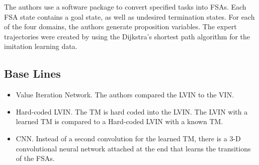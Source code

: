 \documentclass[letterpaper, 10 pt, conference]{ieeeconf}  %
\begin{document}
The authors use a software package to convert specified tasks into FSAs. Each FSA state contains a goal state, as well as undesired termination states. For each of the four domains, the authors generate proposition variables. The expert trajectories were created by using the Dijkstra's shortest path algorithm for the imitation learning data.

\subsection{Base Lines}

\begin{itemize}
  \item Value Iteration Network. The authors compared the LVIN to the VIN.
  \item Hard-coded LVIN. The TM is hard coded into the LVIN. The LVIN with a learned TM is compared to a Hard-coded LVIN with a known TM.
  \item CNN. Instead of a second convolution for the learned TM, there is a 3-D convolutional neural network attached at the end that learns the transitions of the FSAs.
\end{itemize}
\end{document}
